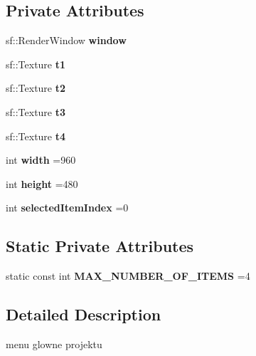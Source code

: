 \subsection*{Private Attributes}
\begin{DoxyCompactItemize}
\item 
\mbox{\label{class_menu_a285c5dff08d0d2bed1154a95daef6a76}} 
sf\+::\+Render\+Window {\bfseries window}
\item 
\mbox{\label{class_menu_a2ae000e3d4ba6e276ff5f6a1b5748f50}} 
sf\+::\+Texture {\bfseries t1}
\item 
\mbox{\label{class_menu_ad82d0c5fcace650ea878a1b08498b9dc}} 
sf\+::\+Texture {\bfseries t2}
\item 
\mbox{\label{class_menu_ae77cf1b4a4572ba0e06cbf905dc92346}} 
sf\+::\+Texture {\bfseries t3}
\item 
\mbox{\label{class_menu_a12f88b5c9357dc22297e3b4a65b24984}} 
sf\+::\+Texture {\bfseries t4}
\item 
\mbox{\label{class_menu_a30ec519ffccb75388150c64175c4959b}} 
int {\bfseries width} =960
\item 
\mbox{\label{class_menu_abfd154ce7b19dca62d1ce8483c6f7bba}} 
int {\bfseries height} =480
\item 
\mbox{\label{class_menu_a464ef16fd28c0df35ee1d9f78c0ef895}} 
int {\bfseries selected\+Item\+Index} =0
\end{DoxyCompactItemize}
\subsection*{Static Private Attributes}
\begin{DoxyCompactItemize}
\item 
\mbox{\label{class_menu_a4b58a01007341bc613ba0b7c6ce16faa}} 
static const int {\bfseries M\+A\+X\+\_\+\+N\+U\+M\+B\+E\+R\+\_\+\+O\+F\+\_\+\+I\+T\+E\+MS} =4
\end{DoxyCompactItemize}


\subsection{Detailed Description}
menu glowne projektu 

